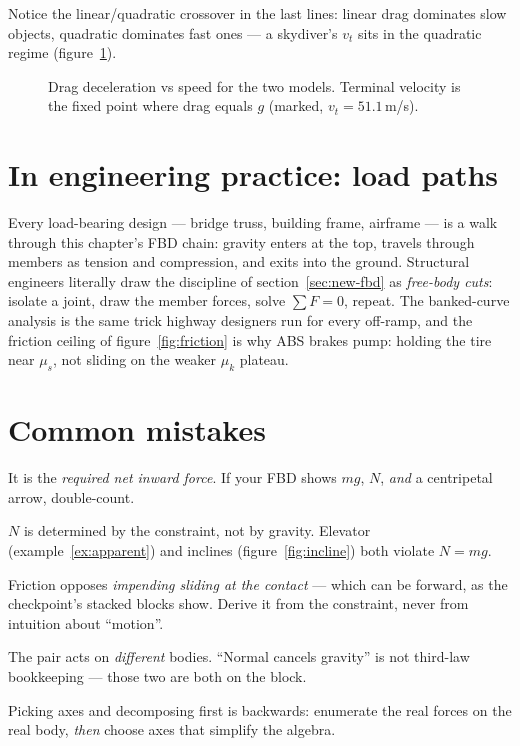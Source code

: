 Notice the linear/quadratic crossover in the last lines: linear drag
dominates slow objects, quadratic dominates fast ones --- a skydiver's
$v_t$ sits in the quadratic regime (figure~\ref{fig:drag}).

\begin{figure}[htbp]\centering

\caption{Drag deceleration vs speed for the two models. Terminal velocity
is the fixed point where drag equals $g$ (marked, $v_t=51.1$\,m/s).}
\label{fig:drag}
\end{figure}

\section{In engineering practice: load paths}\label{sec:new-eng}

Every load-bearing design --- bridge truss, building frame, airframe ---
is a walk through this chapter's FBD chain: gravity enters at the top,
travels through members as tension and compression, and exits into the
ground.
Structural engineers literally draw the discipline of
section~\ref{sec:new-fbd} as \emph{free-body cuts}: isolate a joint, draw
the member forces, solve $\sum F=0$, repeat. The banked-curve analysis is
the same trick highway designers run for every off-ramp, and the
friction ceiling of figure~\ref{fig:friction} is why ABS brakes pump:
holding the tire near $\mu_s$, not sliding on the weaker $\mu_k$ plateau.

\section{Common mistakes}\label{sec:new-mistakes}

\begin{tripwire}
It is the \emph{required net inward force}. If your FBD shows $mg$, $N$,
\emph{and} a centripetal arrow, double-count.
\end{tripwire}
\begin{tripwire}[$N=mg$ on accelerating surfaces]
$N$ is determined by the constraint, not by gravity. Elevator
(example~\ref{ex:apparent}) and inclines (figure~\ref{fig:incline}) both
violate $N=mg$.
\end{tripwire}
\begin{tripwire}
Friction opposes \emph{impending sliding at the contact} --- which can be
forward, as the checkpoint's stacked blocks show. Derive it from the
constraint, never from intuition about ``motion''.
\end{tripwire}
\begin{tripwire}
The pair acts on \emph{different} bodies. ``Normal cancels gravity'' is not
third-law bookkeeping --- those two are both on the block.
\end{tripwire}
\begin{tripwire}
Picking axes and decomposing first is backwards: enumerate the real forces
on the real body, \emph{then} choose axes that simplify the algebra.
\end{tripwire}

